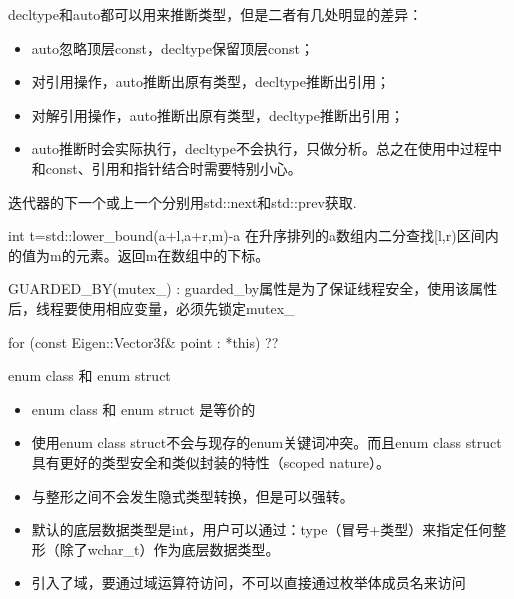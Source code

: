 decltype和auto都可以用来推断类型，但是二者有几处明显的差异：

\begin{itemize}
  \item auto忽略顶层const，decltype保留顶层const；
  \item 对引用操作，auto推断出原有类型，decltype推断出引用；
  \item 对解引用操作，auto推断出原有类型，decltype推断出引用；
  \item auto推断时会实际执行，decltype不会执行，只做分析。总之在使用中过程中和const、引用和指针结合时需要特别小心。
\end{itemize}

迭代器的下一个或上一个分别用std::next和std::prev获取.


int t=std::lower_bound(a+l,a+r,m)-a  在升序排列的a数组内二分查找[l,r)区间内的值为m的元素。返回m在数组中的下标。


GUARDED_BY(mutex_) : 
guarded_by属性是为了保证线程安全，使用该属性后，线程要使用相应变量，必须先锁定mutex_

for (const Eigen::Vector3f& point : *this) ??

enum class 和 enum struct

\begin{itemize}
  \item enum class 和 enum struct 是等价的
  \item 使用enum class \enum struct不会与现存的enum关键词冲突。而且enum class \enum struct具有更好的类型安全和类似封装的特性（scoped nature）。
  \item 与整形之间不会发生隐式类型转换，但是可以强转。
  \item 默认的底层数据类型是int，用户可以通过：type（冒号+类型）来指定任何整形（除了wchar_t）作为底层数据类型。
  \item 引入了域，要通过域运算符访问，不可以直接通过枚举体成员名来访问
\end{itemize}


